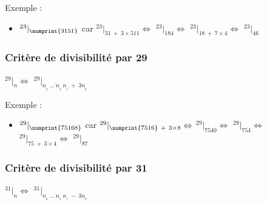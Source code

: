 \documentclass[a4paper, twoside]{article}
\begin{document}
	{ \parindent=0.5cm Exemple : }

	\begin{Large}
	\begin{itemize}

		\item[] $ ^{23}|_{\numprint{3151}}$ {\normalsize car} $^{23}|_{31~+~3\times511} \Leftrightarrow$ $^{23}|_{184} \Leftrightarrow$ $^{23}|_{18~+~7\times4} \Leftrightarrow$ $^{23}|_{46}$\\

	\end{itemize}
	\end{Large}


	\vfill
	{\noindent \dotfill}


	\subsubsection*{Critère de divisibilité par 29}

	\begin{center}
		\huge
		$ ^{29}|_n \Leftrightarrow$ $^{29}|_{\overline{n_{_{k}}~\dots~n_{_2}~n_{_1}}~+~3n_{_0}} $
	\end{center}

	{ \parindent=0.5cm Exemple : }

	\begin{Large}
	\begin{itemize}

		\item[] $ ^{29}|_{\numprint{75168}}$ {\normalsize car} $^{29}|_{\numprint{7516}~+~3\times8} \Leftrightarrow$ $^{29}|_{7540} \Leftrightarrow$ $^{29}|_{754} \Leftrightarrow$ $^{29}|_{75~+~3\times4} \Leftrightarrow$ $^{29}|_{87}$\\

	\end{itemize}
	\end{Large}

	\vfill

	\newpage


	\subsubsection*{Critère de divisibilité par 31}

	\begin{center}
		\huge
		$ ^{31}|_n \Leftrightarrow$ $^{31}|_{\overline{n_{_{k}}~\dots~n_{_2}~n_{_1}}~-~3n_{_0}} $\\
	\end{center}
\end{document}
